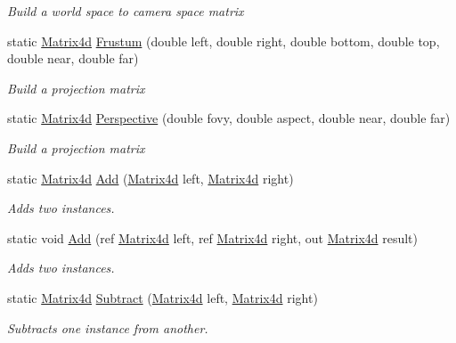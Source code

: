 \begin{DoxyCompactItemize}
\begin{DoxyCompactList}\small\item\em Build a world space to camera space matrix \end{DoxyCompactList}\item 
static \hyperlink{struct_open_t_k_1_1_matrix4d}{Matrix4d} \hyperlink{struct_open_t_k_1_1_matrix4d_aace963819a7713e753f9752025ecc4f0}{Frustum} (double left, double right, double bottom, double top, double near, double far)
\begin{DoxyCompactList}\small\item\em Build a projection matrix \end{DoxyCompactList}\item 
static \hyperlink{struct_open_t_k_1_1_matrix4d}{Matrix4d} \hyperlink{struct_open_t_k_1_1_matrix4d_a8159308fdbac6a573de12512aa89756c}{Perspective} (double fovy, double aspect, double near, double far)
\begin{DoxyCompactList}\small\item\em Build a projection matrix \end{DoxyCompactList}\item 
static \hyperlink{struct_open_t_k_1_1_matrix4d}{Matrix4d} \hyperlink{struct_open_t_k_1_1_matrix4d_a51a26e81fecbe64607c24169b51bf187}{Add} (\hyperlink{struct_open_t_k_1_1_matrix4d}{Matrix4d} left, \hyperlink{struct_open_t_k_1_1_matrix4d}{Matrix4d} right)
\begin{DoxyCompactList}\small\item\em Adds two instances. \end{DoxyCompactList}\item 
static void \hyperlink{struct_open_t_k_1_1_matrix4d_abb2a319c9202a5252b8d30fc8a29a7d0}{Add} (ref \hyperlink{struct_open_t_k_1_1_matrix4d}{Matrix4d} left, ref \hyperlink{struct_open_t_k_1_1_matrix4d}{Matrix4d} right, out \hyperlink{struct_open_t_k_1_1_matrix4d}{Matrix4d} result)
\begin{DoxyCompactList}\small\item\em Adds two instances. \end{DoxyCompactList}\item 
static \hyperlink{struct_open_t_k_1_1_matrix4d}{Matrix4d} \hyperlink{struct_open_t_k_1_1_matrix4d_a50afdf145c70f540852dff77b00ad5c9}{Subtract} (\hyperlink{struct_open_t_k_1_1_matrix4d}{Matrix4d} left, \hyperlink{struct_open_t_k_1_1_matrix4d}{Matrix4d} right)
\begin{DoxyCompactList}\small\item\em Subtracts one instance from another. \end{DoxyCompactList}\item 

\end{DoxyCompactItemize}
